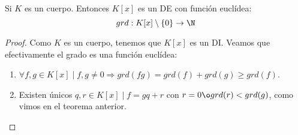 \begin{coro}
    Si $K$ es un cuerpo. Entonces $K[x]$ es un DE con función euclídea:
    $$grd:K[x]\setminus\{0\}\rightarrow\N$$
\end{coro}
\begin{proof}
    Como $K$ es un cuerpo, tenemos que $K[x]$ es un DI. Veamos que efectivamente el grado es una función euclídea:
    
    \begin{enumerate}
        \item $\forall f,g \in K[x] \mid f,g \neq 0 \Longrightarrow grd(fg) = grd(f) + grd(g) \geq grd(f)$.
        \item Existen únicos $q,r \in K[x] \mid f=gq+r$ con $r=0 \o grd(r)<grd(g)$, como vimos en el teorema anterior.
    \end{enumerate}
\end{proof}

